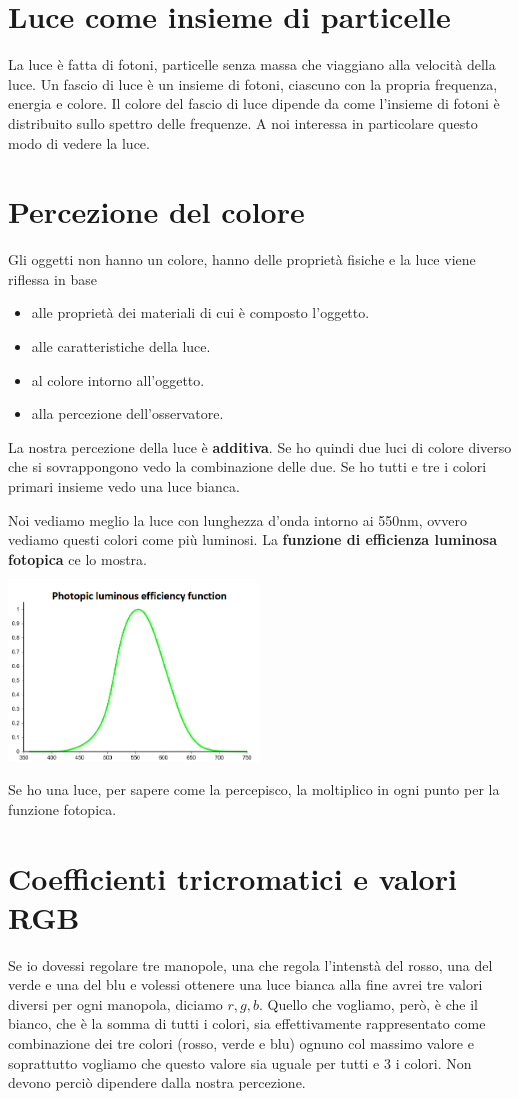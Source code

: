 \section{Luce come insieme di particelle}
La luce \`e fatta di fotoni, particelle senza massa che viaggiano alla velocit\`a della luce.
Un fascio di luce \`e un insieme di fotoni, ciascuno con la propria frequenza, energia e
colore. Il colore del fascio di luce dipende da come l'insieme di fotoni \`e distribuito sullo
spettro delle frequenze. A noi interessa in particolare questo modo di vedere la luce.

\section{Percezione del colore}
Gli oggetti non hanno un colore, hanno delle propriet\`a fisiche e la luce viene riflessa in
base
\begin{itemize}
	\item alle propriet\`a dei materiali di cui \`e composto l'oggetto.
	\item alle caratteristiche della luce.
	\item al colore intorno all'oggetto.
	\item alla percezione dell'osservatore.
\end{itemize}
La nostra percezione della luce \`e \textbf{additiva}. Se ho quindi due luci di colore diverso
che si sovrappongono vedo la combinazione delle due. Se ho tutti e tre i colori primari insieme
vedo una luce bianca.

Noi vediamo meglio la luce con lunghezza d'onda intorno ai 550nm, ovvero vediamo questi colori
come pi\`u luminosi. La \textbf{funzione di efficienza luminosa fotopica} ce lo mostra.
\begin{center}
	\includegraphics[width=0.5\textwidth]{immagini/funzione_fotopica}
\end{center}
Se ho una luce, per sapere come la percepisco, la moltiplico in ogni punto per la funzione
fotopica.

\section{Coefficienti tricromatici e valori RGB}
Se io dovessi regolare tre manopole, una che regola l'intenst\`a del rosso, una del verde e
una del blu e volessi ottenere una luce bianca alla fine avrei tre valori diversi per ogni
manopola, diciamo $r, g, b$. Quello che vogliamo, per\`o, \`e che il bianco, che \`e la somma
di tutti i colori, sia effettivamente rappresentato come combinazione dei tre colori (rosso,
verde e blu) ognuno col massimo valore e soprattutto vogliamo che questo valore sia uguale
per tutti e 3 i colori. Non devono perci\`o dipendere dalla nostra percezione.

